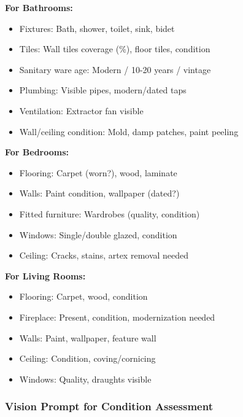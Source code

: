 \documentclass[11pt,a4paper]{article}
\begin{document}
\textbf{For Bathrooms:}
\begin{itemize}
  \item Fixtures: Bath, shower, toilet, sink, bidet
  \item Tiles: Wall tiles coverage (\%), floor tiles, condition
  \item Sanitary ware age: Modern / 10-20 years / vintage
  \item Plumbing: Visible pipes, modern/dated taps
  \item Ventilation: Extractor fan visible
  \item Wall/ceiling condition: Mold, damp patches, paint peeling
\end{itemize}

\textbf{For Bedrooms:}
\begin{itemize}
  \item Flooring: Carpet (worn?), wood, laminate
  \item Walls: Paint condition, wallpaper (dated?)
  \item Fitted furniture: Wardrobes (quality, condition)
  \item Windows: Single/double glazed, condition
  \item Ceiling: Cracks, stains, artex removal needed
\end{itemize}

\textbf{For Living Rooms:}
\begin{itemize}
  \item Flooring: Carpet, wood, condition
  \item Fireplace: Present, condition, modernization needed
  \item Walls: Paint, wallpaper, feature wall
  \item Ceiling: Condition, coving/cornicing
  \item Windows: Quality, draughts visible
\end{itemize}

\subsubsection{Vision Prompt for Condition Assessment}
\end{document}

